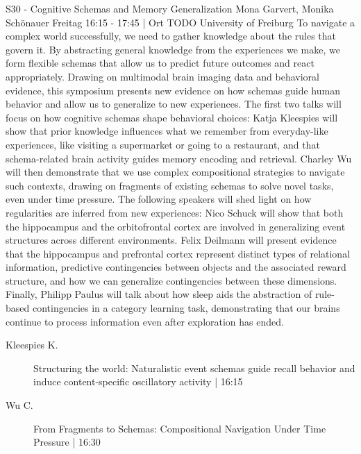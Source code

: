 
            \begin{symposium}
            {S30 - Cognitive Schemas and Memory Generalization}
            {Mona Garvert, Monika Schönauer}
            {Freitag 16:15 - 17:45 | Ort TODO}
            {University of Freiburg}
            To navigate a complex world successfully, we need to gather knowledge about the rules that govern it. By abstracting general knowledge from the experiences we make, we form flexible schemas that allow us to predict future outcomes and react appropriately. Drawing on multimodal brain imaging data and behavioral evidence, this symposium presents new evidence on how schemas guide human behavior and allow us to generalize to new experiences. The first two talks will focus on how cognitive schemas shape behavioral choices: Katja Kleespies will show that prior knowledge influences what we remember from everyday-like experiences, like visiting a supermarket or going to a restaurant, and that schema-related brain activity guides memory encoding and retrieval. Charley Wu will then demonstrate that we use complex compositional strategies to navigate such contexts, drawing on fragments of existing schemas to solve novel tasks, even under time pressure. The following speakers will shed light on how regularities are inferred from new experiences: Nico Schuck will show that both the hippocampus and the orbitofrontal cortex are involved in generalizing event structures across different environments. Felix Deilmann will present evidence that the hippocampus and prefrontal cortex represent distinct types of relational information, predictive contingencies between objects and the associated reward structure, and how we can generalize contingencies between these dimensions. Finally, Philipp Paulus will talk about how sleep aids the abstraction of rule-based contingencies in a category learning task, demonstrating that our brains continue to process information even after exploration has ended.
            \begin{description}    
            
                \item [ Kleespies K.] Structuring the world: Naturalistic event schemas guide recall behavior and induce content-specific oscillatory activity \textcolor{mygray}{ | 16:15}    
                
                \item [ Wu C.] From Fragments to Schemas: Compositional Navigation Under Time Pressure \textcolor{mygray}{ | 16:30}    
                

\end{description}
\end{symposium}
